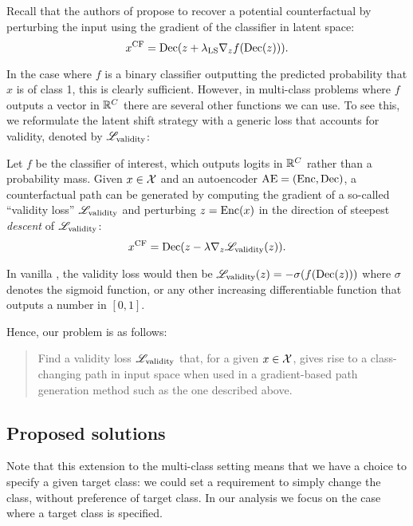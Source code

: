 \documentclass[../main.tex]{subfiles}
\begin{document}
Recall that the authors of \ls{} propose to recover a potential counterfactual by perturbing the input using the gradient of the classifier in latent space:
\begin{equation*}
    x^\mathrm{CF} = \operatorname{Dec}(z + \lambda_\text{LS} \nabla_z f(\operatorname{Dec}(z))).
\end{equation*}

In the case where $f$ is a binary classifier outputting the predicted probability that $x$ is of class 1, this is clearly sufficient.
However, in multi-class problems where $f$ outputs a vector in $\mathbb{R}^C$ there are several other functions we can use.
To see this, we reformulate the latent shift strategy with a generic loss that accounts for validity, denoted by $\mathscr{L}_\text{validity}$:

Let $f$ be the classifier of interest, which outputs logits in $\mathbb{R}^C$ rather than a probability mass.
Given $x \in \mathcal{X}$ and an autoencoder $\mathrm{AE} = (\operatorname{Enc}, \operatorname{Dec})$, a counterfactual path can be generated by computing the gradient of a so-called ``validity loss'' $\mathscr{L}_\text{validity}$ and perturbing $z = \operatorname{Enc}(x)$ in the direction of steepest \emph{descent} of $\mathscr{L}_\text{validity}$:
\begin{equation*}
x^\mathrm{CF} = \operatorname{Dec}(z - \lambda \nabla_z \mathscr{L}_\text{validity}(z)).
\end{equation*}

In vanilla \ls{}, the validity loss would then be $\mathscr{L}_\text{validity}(z) = - \sigma(f(\operatorname{Dec}(z)))$ where $\sigma$ denotes the sigmoid function, or any other increasing differentiable function that outputs a number in $[0, 1]$.

Hence, our problem is as follows:
\begin{quote}
Find a validity loss $\mathscr{L}_\text{validity}$ that, for a given $x \in \mathcal{X}$, gives rise to a class-changing path in input space when used in a gradient-based path generation method such as the one described above.
\end{quote}

\subsection{Proposed solutions}
\label{sec:validity_losses}

Note that this extension to the multi-class setting means that we have a choice to specify a given target class: we could set a requirement to simply change the class, without preference of target class.
In our analysis we focus on the case where a target class is specified.
\end{document}
